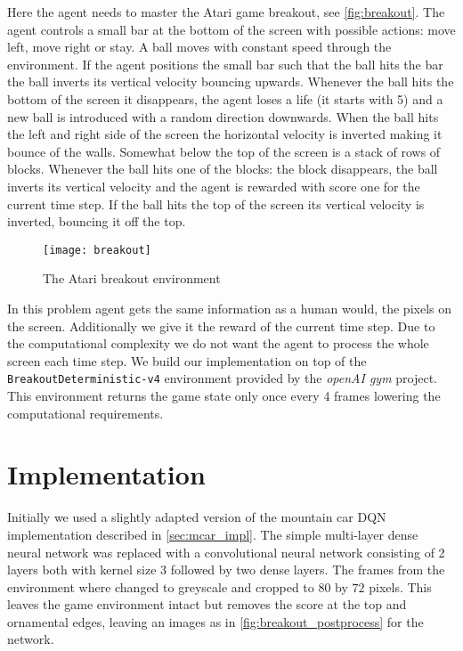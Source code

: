 \label{sec:breakout}
Here the agent needs to master the Atari game breakout, see \autoref{fig:breakout}. The agent controls a small bar at the bottom of the screen with possible actions: move left, move right or stay. A ball moves with constant speed through the environment. If the agent positions the small bar such that the ball hits the bar the ball inverts its vertical velocity bouncing upwards. Whenever the ball hits the bottom of the screen it disappears, the agent loses a life (it starts with 5) and a new ball is introduced with a random direction downwards. When the ball hits the left and right side of the screen the horizontal velocity is inverted making it bounce of the walls. Somewhat below the top of the screen is a stack of rows of blocks. Whenever the ball hits one of the blocks: the block disappears, the ball inverts its vertical velocity and the agent is rewarded with score one for the current time step. If the ball hits the top of the screen its vertical velocity is inverted, bouncing it off the top. 

\begin{figure}
    \texttt{[image: breakout]}
    \caption{The Atari breakout environment}
    \label{fig:breakout}
\end{figure}

In this problem agent gets the same information as a human would, the pixels on the screen. Additionally we give it the reward of the current time step. Due to the computational complexity we do not want the agent to process the whole screen each time step. We build our implementation on top of the \texttt{BreakoutDeterministic-v4} environment provided by the \textit{openAI gym} project. This environment returns the game state only once every 4 frames lowering the computational requirements.

\section{Implementation}
Initially we used a slightly adapted version of the mountain car DQN implementation described in \autoref{sec:mcar_impl}. The simple multi-layer dense neural network was replaced with a convolutional neural network consisting of 2 layers both with kernel size 3 followed by two dense layers. The frames from the environment where changed to greyscale and cropped to $80$ by $72$ pixels. This leaves the game environment intact but removes the score at the top and ornamental edges, leaving an images as in \autoref{fig:breakout_postprocess} for the network.

